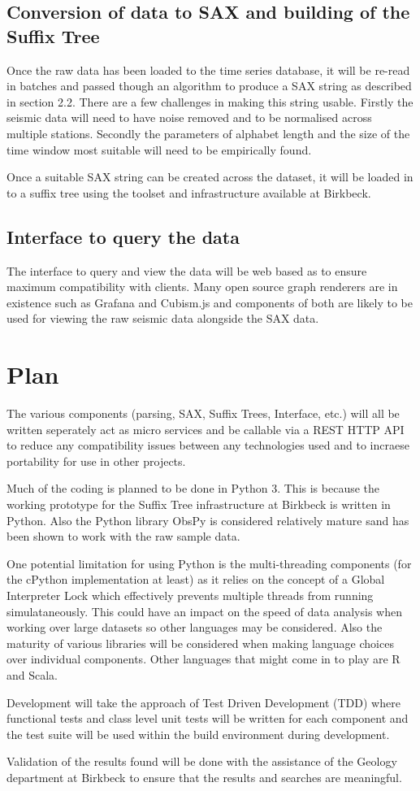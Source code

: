 \documentclass[11pt]{scrartcl}
\begin{document}
\subsection{Conversion of data to SAX and building of the Suffix Tree}
	Once the raw data has been loaded to the time series database, it will be re-read in batches and passed though an algorithm to produce a SAX string as described in section 2.2.  There are a few challenges in making this string usable.  Firstly the seismic data will need to have noise removed and to be normalised across multiple stations.  Secondly the parameters of alphabet length and the size of the time window most suitable will need to be empirically found.
	
	Once a suitable SAX string can be created across the dataset, it will be loaded in to a suffix tree using the toolset and infrastructure available at Birkbeck.

\subsection{Interface to query the data}
	The interface to query and view the data will be web based as to ensure maximum compatibility with clients.  Many open source graph renderers are in existence such as Grafana and Cubism.js and components of both are likely to be used for viewing the raw seismic data alongside the SAX data.

\section{Plan}
	The various components (parsing, SAX, Suffix Trees, Interface, etc.) will all be written seperately act as micro services and be callable via a REST HTTP API to reduce any compatibility issues between any technologies used and to incraese portability for use in other projects.

	Much of the coding is planned to be done in Python 3.  This is because the working prototype for the Suffix Tree infrastructure at Birkbeck is written in Python.  Also the Python library ObsPy is considered relatively mature sand has been shown to work with the raw sample data.
	
	One potential limitation for using Python is the multi-threading components (for the cPython implementation at least) as it relies on the concept of a Global Interpreter Lock which effectively prevents multiple threads from running simulataneously.  This could have an impact on the speed of data analysis when working over large datasets so other languages may be considered.  Also the maturity of various libraries will be considered when making language choices over individual components.  Other languages that might come in to play are R and Scala.
	
	Development will take the approach of Test Driven Development (TDD) where functional tests and class level unit tests will be written for each component and the test suite will be used within the build environment during development.
	
	Validation of the results found will be done with the assistance of the Geology department at Birkbeck to ensure that the results and searches are meaningful.



\end{document}

